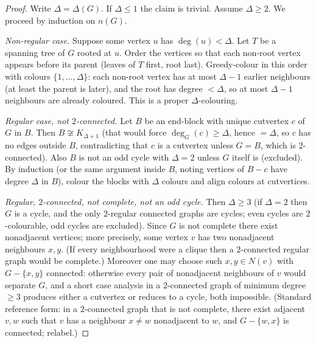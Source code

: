 \documentclass[11pt]{article}
\theoremstyle{definition}
\begin{document}
\begin{proof}
Write \(\Delta=\Delta(G)\). If \(\Delta\le 1\) the claim is trivial. Assume
\(\Delta\ge 2\). We proceed by induction on \(n(G)\).

\emph{Non-regular case.} Suppose some vertex \(u\) has \(\deg(u)<\Delta\). Let \(T\)
be a spanning tree of \(G\) rooted at \(u\). Order the vertices so that each
non-root vertex appears before its parent (leaves of \(T\) first, root last).
Greedy-colour in this order with colours \(\{1,\dots,\Delta\}\): each non-root
vertex has at most \(\Delta-1\) earlier neighbours (at least the parent is later),
and the root has degree \(<\Delta\), so at most \(\Delta-1\) neighbours are
already coloured. This is a proper \(\Delta\)-colouring.

\emph{Regular case, not \(2\)-connected.} Let \(B\) be an end-block with unique
cutvertex \(c\) of \(G\) in \(B\). Then \(B\not\cong K_{\Delta+1}\) (that would force
\(\deg_G(c)\ge\Delta\), hence \(= \Delta\), so \(c\) has no edges outside \(B\),
contradicting that \(c\) is a cutvertex unless \(G=B\), which is \(2\)-connected).
Also \(B\) is not an odd cycle with \(\Delta=2\) unless \(G\) itself is (excluded).
By induction (or the same argument inside \(B\), noting vertices of \(B-c\) have
degree \(\Delta\) in \(B\)), colour the blocks with \(\Delta\) colours and align
colours at cutvertices.

\emph{Regular, \(2\)-connected, not complete, not an odd cycle.} Then \(\Delta\ge 3\)
(if \(\Delta=2\) then \(G\) is a cycle, and the only \(2\)-regular connected graphs
are cycles; even cycles are \(2\)-colourable, odd cycles are excluded). Since \(G\)
is not complete there exist nonadjacent vertices; more precisely, some vertex
\(v\) has two nonadjacent neighbours \(x,y\). (If every neighbourhood were a
clique then a \(2\)-connected regular graph would be complete.) Moreover one may
choose such \(x,y\in N(v)\) with \(G-\{x,y\}\) connected: otherwise every pair of
nonadjacent neighbours of \(v\) would separate \(G\), and a short case analysis in
a \(2\)-connected graph of minimum degree \(\ge 3\) produces either a cutvertex or
reduces to a cycle, both impossible. (Standard reference form: in a
\(2\)-connected graph that is not complete, there exist adjacent \(v,w\) such that
\(v\) has a neighbour \(x\neq w\) nonadjacent to \(w\), and \(G-\{w,x\}\) is
connected; relabel.)


\end{proof}
\end{document}
